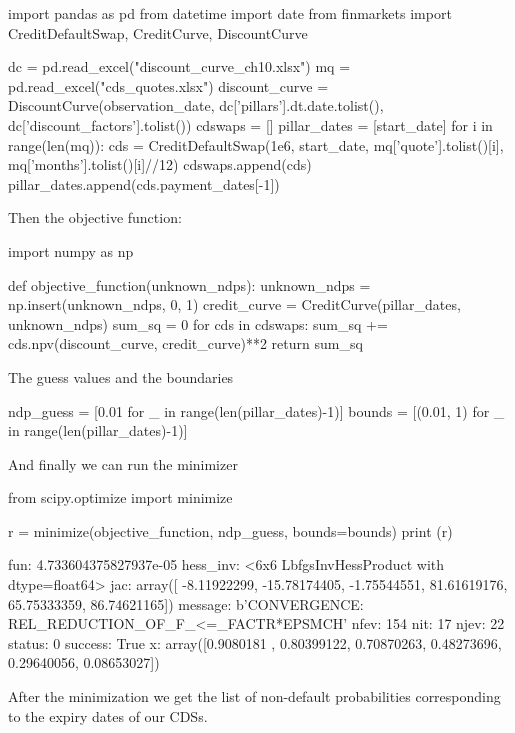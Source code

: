 \begin{ipython}
import pandas as pd
from datetime import date
from finmarkets import CreditDefaultSwap, CreditCurve, DiscountCurve

dc = pd.read_excel("discount_curve_ch10.xlsx")
mq = pd.read_excel("cds_quotes.xlsx")
discount_curve = DiscountCurve(observation_date,
                               dc['pillars'].dt.date.tolist(),
                               dc['discount_factors'].tolist())
cdswaps = []
pillar_dates = [start_date]
for i in range(len(mq)):
    cds = CreditDefaultSwap(1e6, start_date,
                            mq['quote'].tolist()[i],
                            mq['months'].tolist()[i]//12)
    cdswaps.append(cds)
    pillar_dates.append(cds.payment_dates[-1])
\end{ipython}
\noindent
Then the objective function:
\begin{ipython}
import numpy as np

def objective_function(unknown_ndps):
    unknown_ndps = np.insert(unknown_ndps, 0, 1)
    credit_curve = CreditCurve(pillar_dates, unknown_ndps)
    sum_sq = 0
    for cds in cdswaps:
        sum_sq += cds.npv(discount_curve, credit_curve)**2
    return sum_sq
\end{ipython}
\noindent
The guess values and the boundaries
\begin{ipython}
ndp_guess = [0.01 for _ in range(len(pillar_dates)-1)]
bounds = [(0.01, 1) for _ in range(len(pillar_dates)-1)]
\end{ipython}
\noindent
And finally we can run the minimizer
\begin{ipython}
from scipy.optimize import minimize

r = minimize(objective_function, ndp_guess, bounds=bounds)
print (r)
\end{ipython}
\begin{ioutput}
     fun: 4.733604375827937e-05
hess_inv: <6x6 LbfgsInvHessProduct with dtype=float64>
     jac: array([ -8.11922299, -15.78174405,  -1.75544551,  
                  81.61619176,  65.75333359,  86.74621165])
 message: b'CONVERGENCE: REL_REDUCTION_OF_F_<=_FACTR*EPSMCH'
    nfev: 154
     nit: 17
    njev: 22
  status: 0
 success: True
       x: array([0.9080181 , 0.80399122, 0.70870263, 
                 0.48273696, 0.29640056, 0.08653027])
\end{ioutput}

After the minimization we get the list of non-default probabilities corresponding to the expiry dates of our CDSs.

